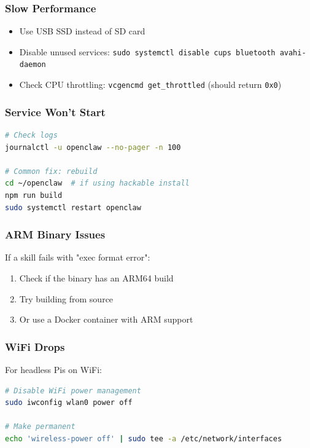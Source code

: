\subsubsection{Slow Performance}


\begin{itemize}
  \item Use USB SSD instead of SD card
  \item Disable unused services: \texttt{sudo systemctl disable cups bluetooth avahi-daemon}
  \item Check CPU throttling: \texttt{vcgencmd get\_throttled} (should return \texttt{0x0})
\end{itemize}


\subsubsection{Service Won't Start}


\begin{lstlisting}[language=bash]
# Check logs
journalctl -u openclaw --no-pager -n 100

# Common fix: rebuild
cd ~/openclaw  # if using hackable install
npm run build
sudo systemctl restart openclaw
\end{lstlisting}


\subsubsection{ARM Binary Issues}


If a skill fails with "exec format error":

\begin{enumerate}
  \item Check if the binary has an ARM64 build
  \item Try building from source
  \item Or use a Docker container with ARM support
\end{enumerate}


\subsubsection{WiFi Drops}


For headless Pis on WiFi:

\begin{lstlisting}[language=bash]
# Disable WiFi power management
sudo iwconfig wlan0 power off

# Make permanent
echo 'wireless-power off' | sudo tee -a /etc/network/interfaces
\end{lstlisting}


